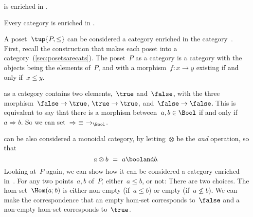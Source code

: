 {	\begin{example}
		\Category is enriched in \Category.
	\end{example}

	\begin{example}
		Every category is enriched in \Set.
	\end{example}

	\begin{example}
		A poset~$\tup{P, \leq}$ can be considered a category enriched in the category~\Bool.
		First, recall the construction that makes each poset into a category~(\cref{sec:posetsarecats}).
		The poset~$P$ as a category is a category with the objects being the elements of~$P$, and with a morphism~$f\colon x \to y$ existing if and only if~$x\leq y$.

		\Bool as a category contains two elements,~$\true$ and~$\false$, with the three morphism~$\false \to \true$, $\true \to \true$, and~$\false \to \false$.
		This is equivalent to say that there is a morphism between~$a, b \in \Bool$ if and only if~$a \Rightarrow b$.
		So we can set~$\Rightarrow\ \equiv\ \to_{\Bool}$.

		\Bool can be also considered a monoidal category, by letting~$\otimes$ be the \emph{and} operation, so that
		\begin{equation}
			a \otimes b\ =\ a \booland b.
		\end{equation}
		Looking at~$P$ again, we can show how it can be considered a category enriched in~\Bool.
		For any two points~$a, b$ of~$P$, either~$a \leq b$, or not: There are two choices.
		The hom-set~$\Hom(a; b)$ is either non-empty (if~$a \leq b$) or empty (if~$a \not\leq b$).
		We can make the correspondence that an empty hom-set corresponds to~$\false$ and a non-empty hom-set corresponds to~$\true$.


\end{example}}
